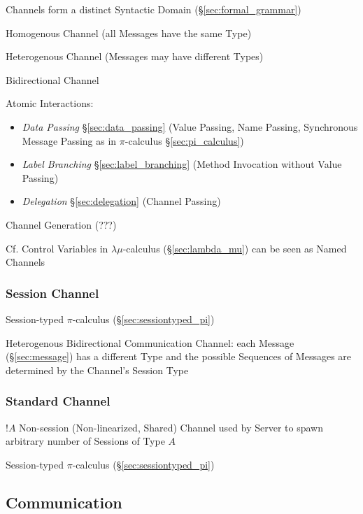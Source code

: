 Channels form a distinct Syntactic Domain (\S\ref{sec:formal_grammar})
\cite{honda-vasconcelos-kubo98}

Homogenous Channel (all Messages have the same Type)

Heterogenous Channel (Messages may have different Types)

Bidirectional Channel

Atomic Interactions:
\begin{itemize}
  \item \emph{Data Passing} \S\ref{sec:data_passing} (Value Passing,
    Name Passing, Synchronous Message Passing as in $\pi$-calculus
    \S\ref{sec:pi_calculus})
  \item \emph{Label Branching} \S\ref{sec:label_branching} (Method
    Invocation without Value Passing)
  \item \emph{Delegation} \S\ref{sec:delegation} (Channel Passing)
\end{itemize}

Channel Generation (???)

\fist Cf. Control Variables in $\lambda\mu$-calculus
(\S\ref{sec:lambda_mu}) can be seen as Named Channels



\subsubsection{Session Channel}\label{sec:session_channel}

Session-typed $\pi$-calculus (\S\ref{sec:sessiontyped_pi})

Heterogenous Bidirectional Communication Channel: each Message
(\S\ref{sec:message}) has a different Type and the possible Sequences
of Messages are determined by the Channel's Session Type
\cite{neubauer-thiemann04}



\subsubsection{Standard Channel}\label{sec:standard_channel}

$!A$ Non-session (Non-linearized, Shared) Channel used by Server to
spawn arbitrary number of Sessions of Type $A$

Session-typed $\pi$-calculus (\S\ref{sec:sessiontyped_pi})



\subsection{Communication}\label{sec:communication}

